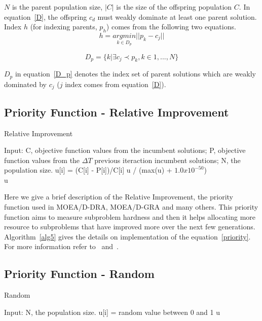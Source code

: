 $N$ is the parent population size, $|C|$ is the size of the offspring population $C$. In equation~\ref{D}, the offspring $c_d$ must weakly dominate at least one parent solution. Index $h$ (for indexing parents, $p_h$) comes from the following two equations.
\begin{equation}
h = \underset{k \in D_p }{argmin} || p_k - c_j ||
\end{equation}

\begin{equation}
\label{D_p}
D_p = \{k| \exists c_j \prec p_k, k \in {1,..., N}\}
\end{equation}

$D_p$ in equation~\ref{D_p} denotes the index set of parent solutions which are weakly dominated by $c_j$ ($j$ index comes from equation~\ref{D}).



\subsection{Priority Function - Relative Improvement}  

\begin{algorithm}[t]
	\caption{Relative Improvement}\label{alg5}
	\begin{algorithmic}[1]
		
		\State Input:  C, objective function values from the incumbent solutions; P, objective function values from the $\Delta T$ previous iteraction incumbent solutions; N, the population size.
		\State u[i] = (C[i] - P[i])/C[i]
		\EndFor
		u / (max(u) + $1.0 x 10^{-50}$)\\
		\Return u
	\end{algorithmic}
\end{algorithm}

Here we give a brief description of the Relative Improvement, the priority function used in MOEA/D-DRA, MOEA/D-GRA and many others. This priority function aims to measure subproblem hardness and then it helps allocating more resource to subproblems that have  improved more over the next few generations. Algorithm~\ref{alg5} gives the details on implementation of the equation~\ref{priority}.  For more information refer to~\cite{zhang2009performance} and~\cite{zhou2016all}.
%
%
\subsection{Priority Function - Random}

\begin{algorithm}[t]
	\caption{Random}\label{alg4}
	\begin{algorithmic}[1]
		
		\State Input:  N, the population size.
		\For {i=1 to N}
		\State u[i] = random value between 0 and 1
		\EndFor
		\Return u
	\end{algorithmic}
\end{algorithm}

